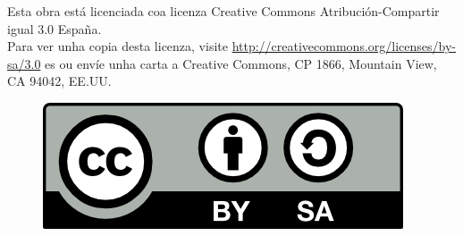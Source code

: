 
\begin{license}
\thispagestyle{empty}
Esta obra está licenciada coa licenza Creative Commons Atribución-Compartir igual
3.0 España. \\

Para ver unha copia desta licenza, visite
\url{http://creativecommons.org/licenses/by-sa/3.0} es ou envíe unha carta a
Creative Commons, CP 1866, Mountain View, CA 94042, EE.UU.

\begin{figure}[htbp]
 \centering
 \includegraphics{./imagenes/by-sa.png}
 \label{figura:License}
\end{figure}

\end{license}

